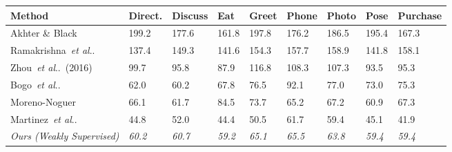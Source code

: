 \documentclass[runningheads]{llncs}
\makeatletter
\newcommand{\ouremph}[1]{{\textit{#1}}}
\DeclareRobustCommand\onedot{\futurelet\@let@token\@onedot}
\def\@onedot{\ifx\@let@token.\else.\null\fi\xspace}
\def\etal{\emph{et al}\onedot}
\makeatother
\begin{document}
\begin{table}[t]
\begin{tabularx}{\textwidth}{ l *{8}{Y} }
		\toprule
		Method & Direct. & Discuss & Eat & Greet & Phone & Photo & Pose & Purchase \\
		\midrule
		Akhter \& Black~\cite{akhter2015pose} & 199.2 & 177.6 & 161.8 & 197.8 & 176.2 & 186.5 & 195.4 & 167.3 \\
		Ramakrishna~\etal~\cite{ramakrishna2012reconstructing} & 137.4 & 149.3 & 141.6 & 154.3 & 157.7 & 158.9 & 141.8 & 158.1 \\
		Zhou~\etal~(2016)\cite{Zhou_2016_CVPR} & 99.7 & 95.8 & 87.9 & 116.8 & 108.3 & 107.3 & 93.5 & 95.3\\
		Bogo~\etal~\cite{keep-it-simpl} & 62.0 & 60.2 & 67.8 & 76.5 & 92.1 & 77.0 & 73.0 & 75.3 \\
		Moreno-Noguer~\cite{Moreno-Noguer_2017_CVPR} & 66.1 & 61.7 & 84.5 & 73.7 & 65.2 & 67.2 & 60.9 & 67.3\\
		Martinez~\etal~\cite{MartinezICCV2017} & {44.8} & {52.0} & {44.4} & {50.5} &	{61.7} & {59.4} & {45.1} & {41.9} \\
		\midrule
		\ouremph{Ours (\textit{Weakly Supervised})} & \ouremph{60.2}&	\ouremph{60.7}&	\ouremph{59.2}&	\ouremph{65.1}&	\ouremph{65.5}&	\ouremph{63.8}&	\ouremph{59.4}&	\ouremph{59.4} \\
		\bottomrule
		

\end{tabularx}
\end{table}
\end{document}
